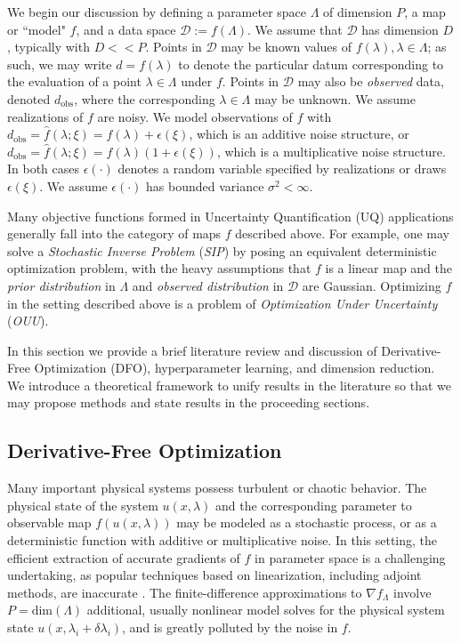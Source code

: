 \documentclass{amsart}
\begin{document}
We begin our discussion by defining a parameter space $\Lambda$ of dimension $P$, a map or ``model" $f$, and a data space $\mathcal{D}:=f(\Lambda)$. We assume that $\mathcal{D}$ has dimension $D$, typically with $D<< P$. Points in $\mathcal{D}$ may be known values of $f(\lambda), \lambda\in \Lambda$; as such, we may write $d=f(\lambda)$ to denote the particular datum corresponding to the evaluation of a point $\lambda \in \Lambda$ under $f$. Points in $\mathcal{D}$ may also be \textit{observed} data, denoted $d_{\text{obs}}$, where the corresponding $\lambda\in \Lambda$ may be unknown. We assume realizations of $f$ are  noisy. We model observations of $f$ with $d_{\text{obs}}=\hat{f}(\lambda;\xi)=f(\lambda)+\epsilon(\xi)$, which is an additive noise structure, or $d_{\text{obs}}=\hat{f}(\lambda;\xi)=f(\lambda)(1+\epsilon(\xi))$, which is a multiplicative noise structure. In both cases $\epsilon(\cdot)$ denotes a random variable specified by realizations or draws $\epsilon(\xi)$. We assume $\epsilon(\cdot)$ has bounded variance $\sigma^2<\infty$.


Many objective functions formed in Uncertainty Quantification (UQ) applications generally fall into the category of maps $f$ described above. For example, one may solve a \textit{Stochastic Inverse Problem} (\textit{SIP}) by posing an equivalent deterministic optimization problem, with the heavy assumptions that $f$ is a linear map and the \textit{prior distribution} in $\Lambda$ and \textit{observed distribution} in $\mathcal{D}$ are Gaussian. Optimizing $f$ in the setting described above is a problem of \textit{Optimization Under Uncertainty} (\textit{OUU}).

In this section we provide a brief literature review and discussion of Derivative-Free Optimization (DFO), hyperparameter learning, and dimension reduction. We introduce a theoretical framework to unify results in the literature so that we may propose methods and state results in the proceeding sections.




\subsection{Derivative-Free Optimization}

Many important physical systems possess turbulent or chaotic behavior.  The physical state of the system $u(x,\lambda)$ and the corresponding parameter
to observable map $f(u(x,\lambda))$ may be modeled as a stochastic process, or as a deterministic function with additive or multiplicative noise.  
In this setting, the efficient extraction of accurate gradients of $f$ in parameter space is a challenging undertaking, as popular techniques based on
linearization, including adjoint methods, are inaccurate \cite{lea2000, Qiqi2014}.  
The finite-difference approximations to $\nabla f_\Lambda$ 
involve $P=\text{dim}(\Lambda)$ 
additional, usually nonlinear model solves for the physical system state $u(x,\lambda_i + \delta \lambda_i)$, and is greatly polluted by the noise in $f$.
\end{document}
